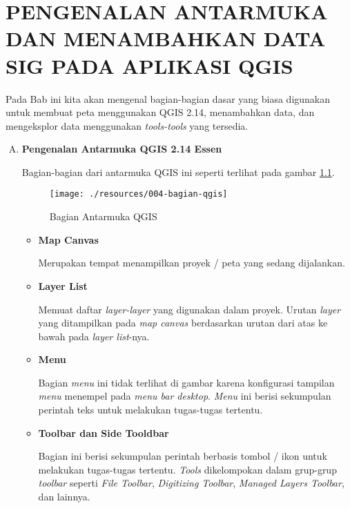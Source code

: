 \chapter{PENGENALAN ANTARMUKA DAN MENAMBAHKAN DATA SIG PADA APLIKASI QGIS}

Pada Bab ini kita akan mengenal bagian-bagian dasar yang biasa digunakan untuk membuat peta menggunakan QGIS 2.14, menambahkan data, dan mengeksplor data menggunakan \textit{tools-tools} yang tersedia.

\begin{enumerate}[A.]

\item \textbf{Pengenalan Antarmuka QGIS 2.14 Essen}

Bagian-bagian dari antarmuka QGIS ini seperti terlihat pada gambar \ref{fig:bagianui}.

\begin{figure}
  \centering
  \texttt{[image: ./resources/004-bagian-qgis]}
  \caption{Bagian Antarmuka QGIS}
  \label{fig:bagianui}
\end{figure}

\begin{itemize}

\item \textbf{Map Canvas}

Merupakan tempat menampilkan proyek / peta yang sedang dijalankan.

\item \textbf{Layer List}

Memuat daftar \textit{layer-layer} yang digunakan dalam proyek. Urutan \textit{layer} yang ditampilkan pada \textit{map canvas} berdasarkan urutan dari atas ke bawah pada \textit{layer list}-nya.

\item \textbf{Menu}

Bagian \textit{menu} ini tidak terlihat di gambar karena konfigurasi tampilan \textit{menu} menempel pada \textit{menu bar desktop}. \textit{Menu} ini berisi sekumpulan perintah teks untuk melakukan tugas-tugas tertentu.

\item \textbf{Toolbar dan Side Tooldbar}

Bagian ini berisi sekumpulan perintah berbasis tombol / ikon untuk melakukan tugas-tugas tertentu. \textit{Tools} dikelompokan dalam grup-grup \textit{toolbar} seperti \textit{File Toolbar}, \textit{Digitizing Toolbar}, \textit{Managed Layers Toolbar}, dan lainnya.


\end{itemize}
\end{enumerate}
